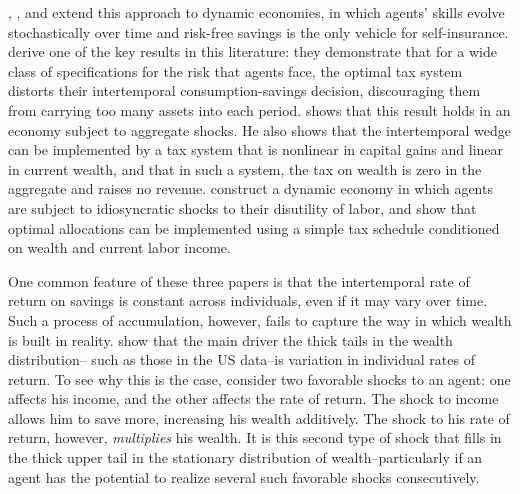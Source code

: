 \documentclass[11pt]{article}
\begin{document}
\cite{golosov2003optimal}, \cite{kocherlakota2005zero}, and \cite{albanesi2006dynamic} extend this approach to dynamic economies, in which agents' skills evolve stochastically over time and risk-free savings is the only vehicle for self-insurance. \cite{golosov2003optimal} derive one of the key results in this literature: they demonstrate that for a wide class of specifications for the risk that agents face, the optimal tax system distorts their intertemporal consumption-savings decision, discouraging them from carrying too many assets into each period. \cite{kocherlakota2005zero} shows that this result holds in an economy subject to aggregate shocks. He also shows that the intertemporal wedge can be implemented by a tax system that is nonlinear in capital gains and linear in current wealth, and that in such a system, the tax on wealth is zero in the aggregate and raises no revenue. \cite{albanesi2006dynamic} construct a dynamic economy in which agents are subject to idiosyncratic shocks to their disutility of labor, and show that optimal allocations can be implemented using a simple tax schedule conditioned on wealth and current labor income. 

One common feature of these three papers is that the intertemporal rate of return on savings is constant across individuals, even if it may vary over time. Such a process of accumulation, however, fails to capture the way in which wealth is built in reality. \cite{benhabib2011distribution} show that the main    driver the thick tails in the wealth distribution-- such as those in the US data--is variation in individual rates of return. To see why this is the case, consider two favorable shocks to an agent: one affects his income, and the other affects the rate of return. The shock to income allows him to save more, increasing his wealth additively. The shock to his rate of return, however, \textit{multiplies} his wealth. It is this second type of shock that fills in the thick upper tail in the stationary distribution of wealth--particularly if an agent has the potential to realize several such favorable shocks consecutively.
\end{document}
